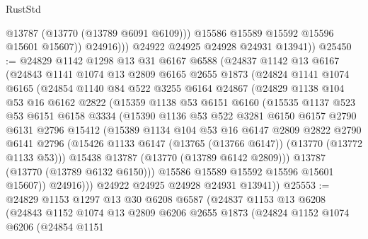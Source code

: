 \begin{lexlean}{RustStd}
\begin{coremodule}
                    @13787
                    (@13770 (@13789 @6091 @6109)))
                  @15586
                  @15589
                  @15592
                  @15596
                  @15601
                  @15607))
              @24916)))
        @24922
        @24925
        @24928
        @24931
        @13941))
@25450 := @24829
    @1142
    @1298
    @13
    @31
    @6167
    @6588
    (@24837
      @1142
      @13
      @6167
      (@24843
        @1141
        @1074
        @13
        @2809
        @6165
        @2655
        @1873
        (@24824
          @1141
          @1074
          @6165
          (@24854
            @1140
            @84
            @522
            @3255
            @6164
            @24867
            (@24829
              @1138
              @104
              @53
              @16
              @6162
              @2822
              (@15359
                @1138
                @53
                @6151
                @6160
                (@15535
                  @1137
                  @523
                  @53
                  @6151
                  @6158
                  @3334
                  (@15390
                    @1136
                    @53
                    @522
                    @3281
                    @6150
                    @6157
                    @2790
                    @6131
                    @2796
                    @15412
                    (@15389
                      @1134
                      @104
                      @53
                      @16
                      @6147
                      @2809
                      @2822
                      @2790
                      @6141
                      @2796
                      (@15426 @1133 @6147 (@13765 (@13766 @6147)) (@13770 (@13772 @1133 @53)))
                      @15438
                      @13787
                      (@13770 (@13789 @6142 @2809)))
                    @13787
                    (@13770 (@13789 @6132 @6150)))
                  @15586
                  @15589
                  @15592
                  @15596
                  @15601
                  @15607))
              @24916)))
        @24922
        @24925
        @24928
        @24931
        @13941))
@25553 := @24829
    @1153
    @1297
    @13
    @30
    @6208
    @6587
    (@24837
      @1153
      @13
      @6208
      (@24843
        @1152
        @1074
        @13
        @2809
        @6206
        @2655
        @1873
        (@24824
          @1152
          @1074
          @6206
          (@24854
            @1151

\end{coremodule}
\end{lexlean}
